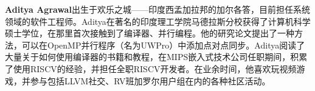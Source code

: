 
\textbf{Aditya Agrawal}出生于欢乐之城——印度西孟加拉邦的加尔各答，目前担任系统领域的软件工程师。Aditya在著名的印度理工学院马德拉斯分校获得了计算机科学硕士学位，在那里首次接触到了编译器、并行编程。他的研究论文提出了一种方法，可以在OpenMP并行程序（名为UWPro）中添加点对点同步。Aditya阅读了大量关于如何使用编译器的书籍和教程，在MIPS嵌入式技术公司任职期间，积累了使用RISCV的经验，并担任全职RISCV开发者。在业余时间，他喜欢玩视频游戏，并参与包括LLVM社交、RV班加罗尔用户组在内的各种社区活动。

